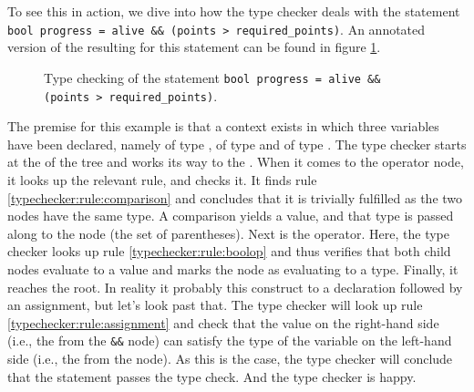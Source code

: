 To see this in action, we dive into how the type checker deals with the statement \texttt{bool progress = alive \&\& (points > required\_points)}. An annotated version of the resulting  for this statement can be found in figure \ref{fig:prim:typechecking}.

\begin{figure}[tbp]
  
  \caption{Type checking of the statement \texttt{bool progress = alive \&\& (points > required\_points)}.}
  \label{fig:prim:typechecking}
\end{figure}

The premise for this example is that a context exists in which three variables have been declared, namely  of type ,  of type  and  of type . The type checker starts at the  of the tree and works its way to the . When it comes to the \keywordname{<} operator node, it looks up the relevant rule, and checks it. It finds rule \ref{typechecker:rule:comparison} and concludes that it is trivially fulfilled as the two  nodes have the same type. A comparison yields a  value, and that type is passed along to the  node (the set of parentheses). Next is the \keywordname{\&\&} operator. Here, the type checker looks up rule \ref{typechecker:rule:boolop} and thus verifies that both child nodes evaluate to a  value and marks the node as evaluating to a  type. Finally, it reaches the root. In reality it probably  this construct to a declaration followed by an assignment, but let's look past that. The type checker will look up rule \ref{typechecker:rule:assignment} and check that the value on the right-hand side (i.e., the  from the \texttt{\&\&} node) can satisfy the type of the variable on the left-hand side (i.e., the  from the  node). As this is the case, the type checker will conclude that the statement passes the type check. And the type checker is happy.


